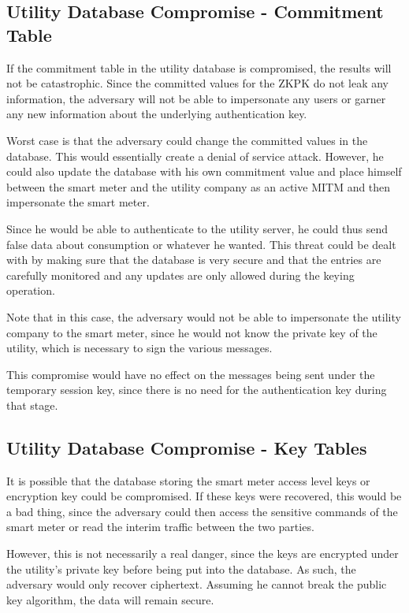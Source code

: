 \subsection{Utility Database Compromise - Commitment Table}
If the commitment table in the utility database is compromised, the results will not be catastrophic. Since the committed
values for the ZKPK do not leak any information, the adversary will not be able to impersonate any users or garner
any new information about the underlying authentication key.

Worst case is that the adversary could change the committed values in the database. This would essentially create a
denial of service attack. However, he could also update the database with his own commitment value and place
himself between the smart meter and the utility company as an active MITM and then impersonate the smart
meter. 

Since he would be able to authenticate to the utility server, he could thus send false data about consumption or 
whatever he wanted. This threat could be dealt with by making sure that the database is very secure
and that the entries are  carefully monitored and any updates are only allowed during the keying operation.

Note that in this case, the adversary would not be able to impersonate the utility company to the smart meter,
since he would not know the private key of the utility, which is necessary to sign the various messages.

This compromise would have no effect on the messages being sent under the temporary session key, since
there is no need for the authentication key during that stage.

\subsection{Utility Database Compromise - Key Tables }
It is possible that the database storing the smart meter access level keys or encryption key could be compromised. 
If these keys were recovered, this would be a bad thing, since the adversary could then access the sensitive commands
of the smart meter or read the interim traffic between the two parties.

However, this is not necessarily a real danger, since the keys are encrypted under the utility's private key before being
put into the database. As such, the adversary would only recover ciphertext. Assuming he cannot break the public
key algorithm, the data will remain secure.

